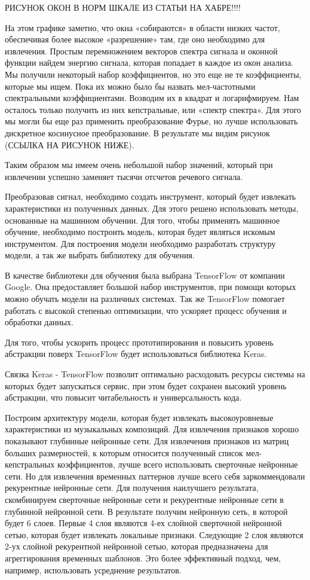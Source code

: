 РИСУНОК ОКОН В НОРМ ШКАЛЕ ИЗ СТАТЬИ НА ХАБРЕ!!!!

На этом графике заметно, что окна «собираются» в области низких частот, обеспечивая более высокое «разрешение» там, где оно необходимо для извлечения. Простым перемножением векторов спектра сигнала и оконной функции найдем энергию сигнала, которая попадает в каждое из окон анализа. Мы получили некоторый набор коэффициентов, но это еще не те коэффициенты, которые мы ищем. Пока их можно было бы назвать мел-частотными спектральными коэффициентами. Возводим их в квадрат и логарифмируем. Нам осталось только получить из них кепстральные, или «спектр спектра». Для этого мы могли бы еще раз применить преобразование Фурье, но лучше использовать дискретное косинусное преобразование. В результате мы видим рисунок (ССЫЛКА НА РИСУНОК НИЖЕ).

Таким образом мы имеем очень небольшой набор значений, который при извлечении успешно заменяет тысячи отсчетов речевого сигнала.

Преобразовав сигнал, необходимо создать инструмент, который будет извлекать характеристики из полученных данных. Для этого решено использовать методы, основанные на машинном обучении. Для того, чтобы применять машинное обучение, необходимо построить модель, которая будет являться искомым инструментом. Для построения модели необходимо разработать структуру модели, а так же выбрать библиотеку для обучения.

В качестве библиотеки для обучения была выбрана TensorFlow от компании Google. Она предоставляет большой набор инструментов, при помощи которых можно обучать модели на различных системах. Так же TensorFlow помогает работать с высокой степенью оптимизации, что ускоряет процесс обучения и обработки данных.

Для того, чтобы ускорить процесс прототипирования и повысить уровень абстракции поверх TensorFlow будет использоваться библиотека Keras.

Связка Keras - TensorFlow позволит оптимально расходовать ресурсы системы на которых будет запускаться сервис, при этом будет сохранен высокий уровень абстракции, что повысит читабельность и универсальность кода.

Построим архитектуру модели, которая будет извлекать высокоуровневые характеристики из музыкальных композиций. Для извлечения признаков хорошо показывают глубинные нейронные сети. Для извлечения признаков из матриц больших размерностей, к которым относится полученный список мел-кепстральных коэффициентов, лучше всего использовать сверточные нейронные сети. Но для извлечения временных паттернов лучше всего себя заркоммендовали рекурентные нейронные сети. Для получения наилучшего результата, скомбинируем сверточные нейронные сети и рекурентные нейронные сети в глубинной нейронной сети. В результате получим нейронную сеть, в которой будет 6 слоев. Первые 4 слоя являются 4-ех слойной сверточной нейронной сетью, которая будет извлекать локальные признаки. Следующие 2 слоя являются 2-ух слойной рекурентной нейронной сетью, которая предназначена для агреггирования временных шаблонов. Это более эффективный подход, чем, например, использовать усреднение результатов.

